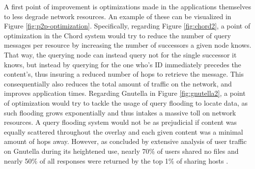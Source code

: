     A first point of improvement is optimizations made in the applications themselves to less degrade network resources.
    An example of these can be visualized in Figure \ref{fig:p2p-optimization}.
    Specifically, regarding Figure \ref{fig:chord2}, a point of optimization in the Chord system would try to reduce the number of query messages per resource by increasing the number of successors a given node knows.
    That way, the querying node can instead query not for the single successor it knows, but instead by querying for the one who's ID immediately precedes the content's, thus insuring a reduced number of hops to retrieve the message.
    This consequentially also reduces the total amount of traffic on the network, and improves application times.
    Regarding Gnutella in Figure \ref{fig:gnutella2}, a point of optimization would try to tackle the usage of query flooding to locate data, as such flooding grows exponentially and thus intakes a massive toll on network resources.
    A query flooding system would not be as prejudicial if content was equally scattered throughout the overlay and each given content was a minimal amount of hops away.
    However, as concluded by extensive analysis of user traffic on Gnutella during its heightened use, nearly 70\% of users shared no files and nearly 50\% of all responses were returned by the top 1\% of sharing hosts \cite{freeriding-gnutella}.

